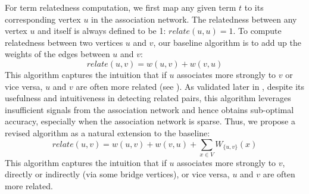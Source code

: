 For term relatedness computation, we first map any given term $t$ to
its corresponding vertex $u$ in the association network. 
The relatedness between any vertex $u$ and itself is always defined to be 1:
$relate(u,u)=1$.
To compute relatedness between two vertices $u$ and $v$, 
our baseline algorithm is to add up the weights of the edges
between $u$ and $v$: 
\begin{equation}
relate(u,v)=w(u,v)+w(v,u)
\label{eq:baseline}
\end{equation} 
This algorithm captures the intuition that if $u$ associates more 
strongly to $v$ or
vice versa, $u$ and $v$ are often more related (see ).
As validated later in , despite its usefulness and 
intuitiveness in detecting related pairs, this algorithm leverages
insufficient signals from the association network and hence obtains 
sub-optimal accuracy, especially when the association network is sparse.
Thus, we propose a revised algorithm as a natural extension to the 
baseline: 
\begin{equation}
relate(u,v)=w(u,v)+w(v,u)+\sum_{x\in V}W_{\{u, v\}}(x)
\label{eq:revised}
\end{equation}
This algorithm captures the intuition that if $u$ associates more strongly to $v$, 
directly or indirectly (via some bridge vertices), or vice versa, $u$ and $v$ are often more related.




